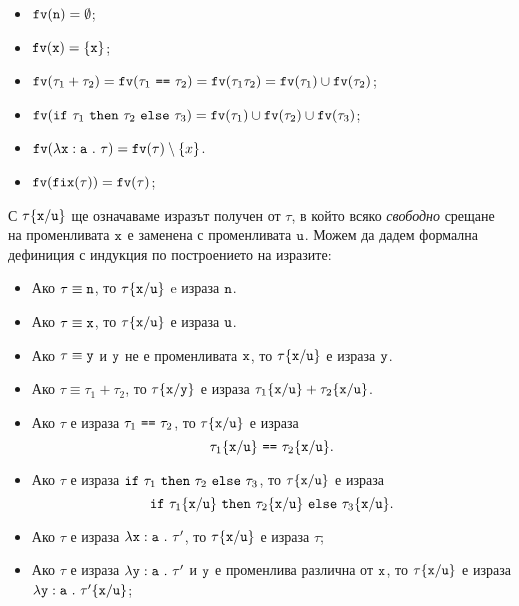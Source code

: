 \begin{itemize}
\item
  $\texttt{fv}(\texttt{n}) = \emptyset$;
\item
  $\texttt{fv}(\texttt{x}) = \{\texttt{x}\}$;
\item
  $\fv(\tau_1 + \tau_2) = \fv(\tau_1\ \vv{==}\ \tau_2) = \fv(\tau_1\tau_2) = \fv(\tau_1) \cup \fv(\tau_2)$;
\item
  $\texttt{fv}(\texttt{if}\ \tau_1\ \texttt{then}\ \tau_2\ \texttt{else}\ \tau_3) = \texttt{fv}(\tau_1) \cup \texttt{fv}(\tau_2) \cup \texttt{fv}(\tau_3)$;
\item
  $\texttt{fv}(\lambda\texttt{x}:\texttt{a}\ .\ {\tau}) = \texttt{fv}(\tau) \setminus \{x\}$.
\item
  $\texttt{fv}(\texttt{fix}(\tau)) = \texttt{fv}(\tau)$;
\end{itemize}


\newcommand{\rename}[2]{\{\vv{#1}/\vv{#2}\}}
\newcommand{\subst}[2]{[\vv{#1}/{#2}]}

С $\tau\rename{x}{u}$ ще означаваме изразът получен от $\tau$, в който всяко \emph{свободно} срещане на променливата $\texttt{x}$
е заменена с променливата $\texttt{u}$. Можем да дадем формална дефиниция с индукция по построението на изразите:
\begin{itemize}
\item
  Ако $\tau \equiv \texttt{n}$, то $\tau\rename{x}{u}$ e израза $\texttt{n}$.
\item
  Ако $\tau \equiv \texttt{x}$, то $\tau\rename{x}{u}$ е израза $\texttt{u}$.
\item
  Ако $\tau \equiv \texttt{y}$ и $\texttt{y}$ не е променливата $\texttt{x}$, то $\tau\rename{x}{u}$ е израза $\texttt{y}$.
\item
  Ако $\tau \equiv \tau_1 + \tau_2$, то
  $\tau\rename{x}{y}$ е израза $\tau_1\rename{x}{u} + \tau_2\rename{x}{u}$.
\item
  Ако $\tau$ е израза $\tau_1\ \texttt{==}\ \tau_2$, то $\tau\rename{x}{u}$ е израза
  \[\tau_1\rename{x}{u}\ \vv{==}\ \tau_2\rename{x}{u}.\]
\item
  Ако $\tau$ е израза $\texttt{if}\ \tau_1\ \texttt{then}\ \tau_2\ \texttt{else}\ \tau_3$, то $\tau\rename{x}{u}$ е израза
  \[\ifelse{\tau_1\rename{x}{u}}{\tau_2\rename{x}{u}}{\tau_3\rename{x}{u}}.\]
\item
  Ако $\tau$ е израза $\lambda\texttt{x}:\texttt{a}\ .\ {\tau'}$, то
  $\tau\rename{x}{u}$ е израза $\tau$;
\item
  Ако $\tau$ е израза $\lambda\texttt{y}:\texttt{a}\ .\ {\tau'}$ и $\texttt{y}$ е променлива различна от $\texttt{x}$, то
  $\tau\rename{x}{u}$ е израза $\lamb{y}{a}{\tau'\rename{x}{u}}$;
\end{itemize}

